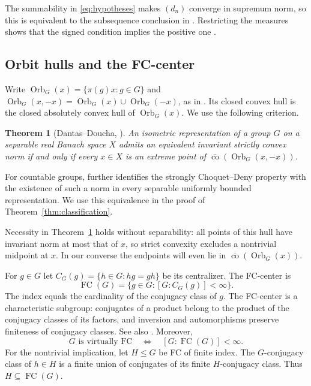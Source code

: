 \documentclass[11pt,letterpaper]{amsart}
\newtheorem{theorem}{Theorem}[section]
\theoremstyle{definition}
\theoremstyle{remark}
\DeclareMathOperator{\co}{co}
\DeclareMathOperator{\Orb}{Orb}
\DeclareMathOperator{\FC}{FC}
\begin{document}
The summability in \eqref{eq:hypotheses} makes $(d_n)$ converge in
supremum norm, so this is equivalent to the subsequence conclusion in
\cite[Definition~2.4]{DD}. Restricting the measures shows that the
signed condition implies the positive one \cite[Proposition~2.5]{DD}.

\subsection{Orbit hulls and the FC-center}
Write $\Orb_G(x)=\{\pi(g)x:g\in G\}$ and
$\Orb_G(x,-x)=\Orb_G(x)\cup\Orb_G(-x)$, as in
\cite[Section~2.1]{DD}. Its closed convex hull is the closed absolutely
convex hull of $\Orb_G(x)$. We use the following criterion.

\begin{theorem}[{Dantas--Doucha, \cite[Theorem~3.1]{DD}}]
\label{thm:criterion}
An isometric representation of a group $G$ on a separable real Banach
space $X$ admits an equivalent invariant strictly convex norm if and
only if every $x\in X$ is an extreme point of
$\overline{\co}(\Orb_G(x,-x))$.
\end{theorem}

For countable groups, \cite[Theorem~4.2]{DD} further identifies the
strongly Choquet--Deny property with the existence of such a norm in
every separable uniformly bounded representation. We use this
equivalence in the proof of Theorem~\ref{thm:classification}.

Necessity in Theorem~\ref{thm:criterion} holds without separability:
all points of this hull have
invariant norm at most that of $x$, so strict convexity excludes a
nontrivial midpoint at $x$. In our converse the endpoints will even
lie in $\overline{\co}(\Orb_G(x))$.

For $g\in G$ let $C_G(g)=\{h\in G:hg=gh\}$ be its centralizer.
The FC-center is
\[
 \FC(G)=\{g\in G:[G:C_G(g)]<\infty\}.
\]
The index equals the cardinality of the conjugacy class of $g$.
The FC-center is a characteristic subgroup: conjugates of a product
belong to the product of the conjugacy classes of its factors, and
inversion and automorphisms preserve finiteness of conjugacy classes.
See also \cite[Section~5.B]{EK}. Moreover,
\begin{equation}\label{eq:fc-index}
 G\text{ is virtually FC}\quad\Longleftrightarrow\quad
 [G:\FC(G)]<\infty.
\end{equation}
For the nontrivial implication, let $H\leq G$ be FC of finite index.
The $G$-conjugacy class of $h\in H$ is a finite union of conjugates
of its finite $H$-conjugacy class. Thus $H\subseteq\FC(G)$.
\end{document}
